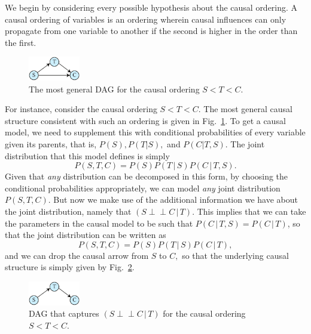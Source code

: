 \documentclass[letterpaper,onecolumn,nofootinbib]{revtex4}
\def\indep{\perp\!\!\!\!\perp}
\begin{document}
We begin by considering every possible hypothesis about the causal ordering. A
causal ordering of variables is an ordering wherein causal influences can
only propagate from one variable to another if the second is higher in the
order than the first.

\begin{figure}[h]
	\centering
	\includegraphics[width=0.2\textwidth]{smoke-gen}
 \caption{The most general DAG for the causal ordering $S<T<C$.}
       \label{fig:smoke-STC-gen}
\end{figure}

For instance, consider the causal ordering $S<T<C.$ The most general
causal structure consistent with such an ordering is given in Fig.~\ref{fig:smoke-STC-gen}.
To get a causal model, we need to supplement this with conditional
probabilities of every variable given its parents, that is, $P(S),P(T|S),$
and $P(C|T,S).$ The joint distribution that this model defines is simply%
\begin{equation*}
P(S,T,C)=P(S)P(T\,|\,S)P(C\,|\,T,S).
\end{equation*}%
Given that \emph{any} distribution can be decomposed in this form, by
choosing the conditional probabilities appropriately, we can model \emph{any
}joint distribution $P(S,T,C).$ But now we make use of the additional
information we have about the joint distribution, namely that $(S\indep C\,|\,T).$
This implies that we can take the parameters in
the causal model to be such that $P(C\,|\,T,S)=P(C\,|\,T)$, so that the joint
distribution can be written as
\begin{equation*}
P(S,T,C)=P(S)P(T\,|\,S)P(C\,|\,T),
\end{equation*}%
and we can drop the causal arrow from $S$ to $C,$ so that the underlying causal structure is simply given by Fig.~\ref{fig:smoke-STC-ind}.
\begin{figure}[h]
	\centering
	\includegraphics[width=0.2\textwidth]{smoke-ind}
 \caption{DAG that captures $(S\indep C\,|\,T)$ for the causal ordering $S<T<C$.}
       \label{fig:smoke-STC-ind}
\end{figure}
\end{document}
